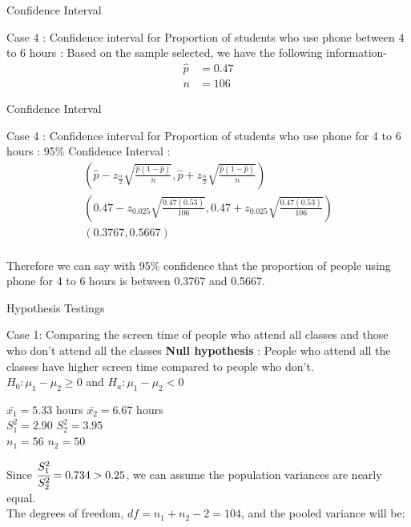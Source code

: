 \documentclass{beamer}
\begin{document}
\begin{frame}{Confidence Interval}
\begin{block}{Case 4 :  Confidence interval for Proportion of students who use phone between 4 to 6 hours :}
Based on the sample selected, we have the following information-
\begin{align}
    \hat{p} &= 0.47\\
    n &= 106
\end{align}
\end{block}
\end{frame}
\begin{frame}{Confidence Interval}
\begin{block}{Case 4 :  Confidence interval for Proportion of students who use phone for 4 to 6 hours :}
95\% Confidence Interval :
 \begin{gather}
      \left(\hat{p}-z_{\frac{\alpha}{2}}\sqrt{\frac{\hat{p}(1-\hat{p})}{n}},\hat{p}+z_{\frac{\alpha}{2}}\sqrt{\frac{\hat{p}(1-\hat{p})}{n}}\right)
      \\\left(0.47-z_{0.025}\sqrt{\frac{0.47(0.53)}{106}},0.47+z_{0.025}\sqrt{\frac{0.47(0.53)}{106}}\right)
      \\(0.3767,0.5667)
 \end{gather}
 \newline
\\Therefore we can say with 95\% confidence that the proportion of people using phone for 4 to 6 hours is between 0.3767 and 0.5667.
\end{block}
\end{frame}









\begin{frame}{Hypothesis Testings}
\begin{block}{Case 1: Comparing the screen time of people who attend all classes and those who don't attend all the classes}
\textbf{Null hypothesis} : People who attend all the classes have higher screen time compared to people who don't.\\
  $ H_0 : \mu_1 - \mu_2 \geq 0$ and $H_a : \mu_1 - \mu_2 < 0$
\par
\begin{center}
    $\bar{x_1} = 5.33$ hours \quad $\bar{x_2} = 6.67$ hours \\
    $S^2_1 = 2.90$ \quad
    $S^2_2 = 3.95$ \\
    $n_1 = 56$ \quad
    $n_2 = 50$
\end{center}
Since $\cfrac{S_1^2}{S_2^2} = 0.734 > 0.25$, we can assume the population variances are nearly equal.\\
The degrees of freedom, $df = n_1 + n_2 -2 = 104$, and the pooled variance will be:
\end{block}
\end{frame}
\end{document}
